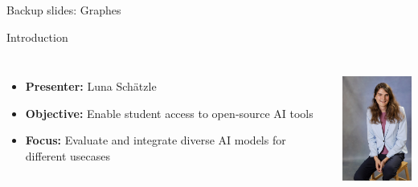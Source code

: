 \documentclass{beamer}
\begin{document}
\begin{frame}[plain]
  \centering
  \vspace{1cm}
  \Huge Backup slides: Graphes
\end{frame}



\begin{frame}
  \maketitle
\end{frame}

\begin{frame}{Introduction}
  \begin{columns}
      \begin{itemize}
        \item \textbf{Presenter:} Luna Schätzle 
        \item \textbf{Objective:} Enable student access to open‑source AI tools
        \item \textbf{Focus:} Evaluate and integrate diverse AI models for different usecases
      \end{itemize}
      \centering
      \includegraphics[height=4cm,keepaspectratio]{Luna-Schaetzle.jpg} %
  \end{columns}
\end{frame}
\end{document}
